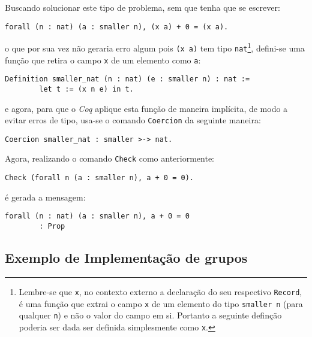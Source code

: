 Buscando solucionar este tipo de problema, sem que tenha que se escrever:
\begin{lstlisting}[language = coq]
    forall (n : nat) (a : smaller n), (x a) + 0 = (x a).
\end{lstlisting}
o que por sua vez não geraria erro algum pois \lstinline[language = coq]$(x a)$ tem tipo \lstinline[language = coq]$nat$\footnote{Lembre-se que \lstinline[language = coq]$x$, no contexto externo a declaração do seu respectivo \lstinline[language = coq]$Record$, é uma função que extrai o campo \lstinline[language = coq]$x$ de um elemento do tipo \lstinline[language = coq]$smaller n$ (para qualquer \lstinline[language = coq]$n$) e não o valor do campo em si. Portanto a seguinte definção poderia ser dada ser definida simplesmente como \lstinline[language = coq]$x$.}, defini-se uma função que retira o campo \lstinline[language = coq]$x$ de um elemento como \lstinline[language = coq]$a$:
\begin{lstlisting}[language = coq]
    Definition smaller_nat (n : nat) (e : smaller n) : nat :=
        let t := (x n e) in t.
\end{lstlisting}
e agora, para que o \textit{Coq} aplique esta função de maneira implícita, de modo a evitar erros de tipo, usa-se o comando \lstinline[language = coq]$Coercion$ da seguinte maneira:
\begin{lstlisting}[language = coq]
    Coercion smaller_nat : smaller >-> nat.
\end{lstlisting}
Agora, realizando o comando \lstinline[language = coq]$Check$ como anteriormente:
\begin{lstlisting}[language = coq]
    Check (forall n (a : smaller n), a + 0 = 0).
\end{lstlisting}
é gerada a mensagem:
\begin{lstlisting}[language = coq-error]
    forall (n : nat) (a : smaller n), a + 0 = 0
        : Prop
\end{lstlisting}

\subsection{Exemplo de Implementação de grupos}

